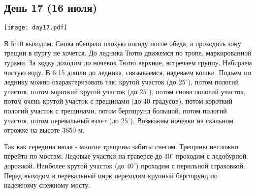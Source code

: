 \graphicspath{{Pictures/Chapter5/Day17}}


\subsection{День 17 (16 июля)}\label{subsec:Day17}
    \parbox[c]{\textwidth}{%
        \texttt{[image: day17.pdf]}\label{fig:Day17_map}%
    }
    \vspace{0.8cm}

В 5:10 выходим. Снова обещали плохую погоду после обеда, а проходить зону трещин в пургу не хочется. До ледника Тютю движемся по тропе, маркированной турами. За ходку доходим до ночевок Тютю верхние, встречаем группу. Набираем чистую воду. В 6:15 дошли до ледника, связываемся, надеваем кошки. Подъем по леднику можно охарактеризовать так: крутой участок (до $25^\circ$), потом пологий участок, потом короткий крутой участок (до $25^\circ$), потом снова пологий участок, потом очень крутой участок с трещинами (до 40 градусов), потом короткий  пологий участок с трещинами, потом бергшрунд большой, потом пологий участок, потом перевальный взлет (до $25^\circ$). Возможны ночевки на скальном отрожке на высоте 3850 м.

Так как середина июля - многие трещины забиты снегом. Трещины несложно перейти по
мостам. Ледовые участки на траверсе до $30^\circ$ проходим с ледобурной дорожкой. Наиболее крутой участок (до $40^\circ$) проходим с перильной страховкой. Перед выходом в перевальный цирк переходим крупный бергшрунд по надежному снежному мосту.

